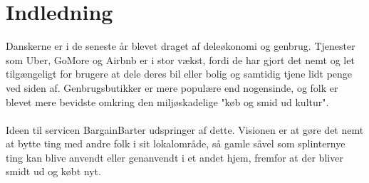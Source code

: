 \chapter{Indledning}
Danskerne er i de seneste år blevet draget af deleøkonomi og genbrug. Tjenester som Uber, GoMore og Airbnb er i stor vækst, fordi de har gjort det nemt og let tilgængeligt for brugere at dele deres bil eller bolig og samtidig tjene lidt penge ved siden af. Genbrugsbutikker er mere populære end nogensinde, og folk er blevet mere bevidste omkring den miljøskadelige "køb og smid ud kultur". \\ \\ \noindent
Ideen til servicen BargainBarter udspringer af dette. Visionen er at gøre det nemt at bytte ting med andre folk i sit lokalområde, så gamle såvel som splinternye ting kan blive anvendt eller genanvendt i et andet hjem, fremfor at der bliver smidt ud og købt nyt. 
\\ \noindent




